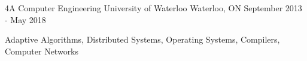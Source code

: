 

\begin{cventries}

  \cventry
    {4A Computer Engineering} %
    {University of Waterloo} %
    {Waterloo, ON} %
    {September 2013 - May 2018} %
    {
      \begin{cvitems} %
      \item {Adaptive Algorithms, Distributed Systems, Operating Systems, Compilers, Computer Networks}
      \end{cvitems}
    }

\end{cventries}
